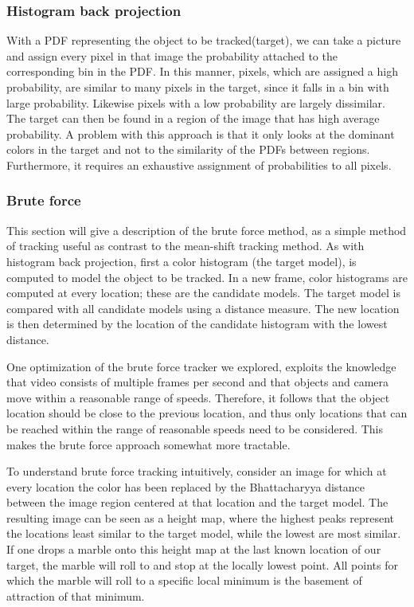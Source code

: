 \documentclass[a4paper,11pt]{article}
\begin{document}
\subsubsection{Histogram back projection}

With a PDF representing the object to be tracked(target), we can take a picture and assign every pixel in that image the probability attached to the corresponding bin in the PDF. In this manner, pixels, which are assigned a high probability, are similar to many pixels in the target, since it falls in a bin with large probability. Likewise pixels with a low probability are largely dissimilar. The target can then be found in a region of the image that has high average probability. A problem with this approach is that it only looks at the dominant colors in the target and not to the similarity of the PDFs between regions. Furthermore, it requires an exhaustive assignment of probabilities to all pixels.


\subsubsection{Brute force}
This section will give a description of the brute force method, as a simple method of tracking useful as contrast to the mean-shift tracking method. As with histogram back projection, first a color histogram (the target model), is computed to model the object to be tracked. In a new frame, color histograms are computed at every location; these are the candidate models. The target model is compared with all candidate models using a distance measure. The new location is then determined by the location of the candidate histogram with the lowest distance.

One optimization of the brute force tracker we explored, exploits the knowledge that video consists of multiple frames per second and that objects and camera move within a reasonable range of speeds. Therefore, it follows that the object location should be close to the previous location, and thus only locations that can be reached within the range of reasonable speeds need to be considered. This makes the brute force approach somewhat more tractable. 

To understand brute force tracking intuitively, consider an image for which at every location the color has been replaced by the Bhattacharyya distance between the image region centered at that location and the target model. The resulting image can be seen as a height map, where the highest peaks represent the locations least similar to the target model, while the lowest are most similar. If one drops a marble onto this height map at the last known location of our target, the marble will roll to and stop at the locally lowest point. All points for which the marble will roll to a specific local minimum is the basement of attraction of that minimum. 
\end{document}
